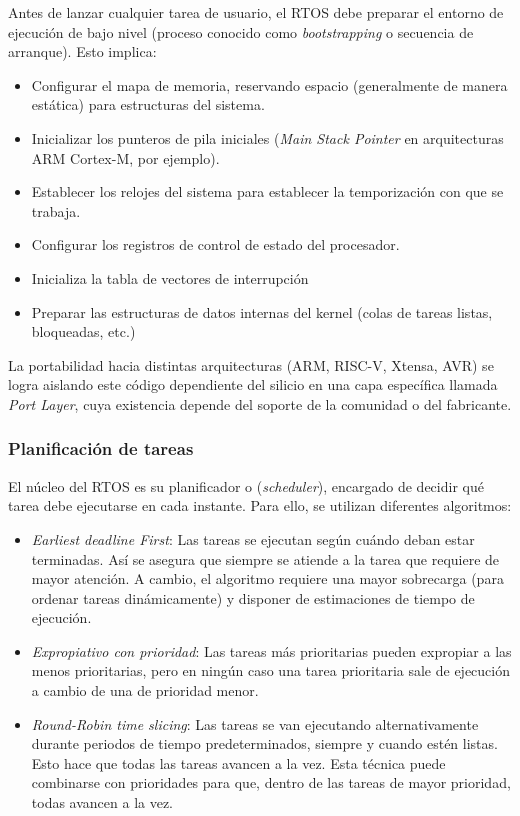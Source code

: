 \documentclass[../main.tex]{subfiles}
\begin{document}
            Antes de lanzar cualquier tarea de usuario, el RTOS debe preparar el entorno de ejecución de bajo nivel (proceso conocido como \emph{bootstrapping} o secuencia de arranque). Esto implica:
            \begin{itemize}
                \item Configurar el mapa de memoria, reservando espacio (generalmente de manera estática) para estructuras del sistema.
                \item Inicializar los punteros de pila iniciales (\emph{Main Stack Pointer} en arquitecturas ARM Cortex-M, por ejemplo).
                \item Establecer los relojes del sistema para establecer la temporización con que se trabaja.
                \item Configurar los registros de control de estado del procesador.
                \item Inicializa la tabla de vectores de interrupción
                \item Preparar las estructuras de datos internas del kernel (colas de tareas listas, bloqueadas, etc.)
            \end{itemize}
                
            La portabilidad hacia distintas arquitecturas (ARM, RISC-V, Xtensa, AVR) se logra aislando este código dependiente del silicio en una capa específica llamada \emph{Port Layer}, cuya existencia depende del soporte de la comunidad o del fabricante. 

        \subsubsection{Planificación de tareas} 
            El núcleo del RTOS es su planificador o (\emph{scheduler}), encargado de decidir qué tarea debe ejecutarse en cada instante. Para ello, se utilizan diferentes algoritmos:

            \begin{itemize}
                \item \emph{Earliest deadline First}: Las tareas se ejecutan según cuándo deban estar terminadas. Así se asegura que siempre se atiende a la tarea que requiere de mayor atención. A cambio, el algoritmo requiere una mayor sobrecarga (para ordenar tareas dinámicamente) y disponer de estimaciones de tiempo de ejecución.
                \item \emph{Expropiativo con prioridad}: Las tareas más prioritarias pueden expropiar a las menos prioritarias, pero en ningún caso una tarea prioritaria sale de ejecución a cambio de una de prioridad menor.
                \item \emph{Round-Robin time slicing}: Las tareas se van ejecutando alternativamente durante periodos de tiempo predeterminados, siempre y cuando estén listas. Esto hace que todas las tareas avancen a la vez. Esta técnica puede combinarse con prioridades para que, dentro de las tareas de mayor prioridad, todas avancen a la vez. 
            \end{itemize}
\end{document}
